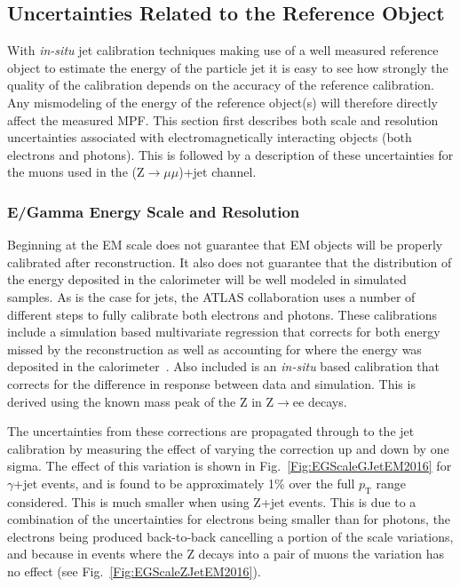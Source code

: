 \subsection{Uncertainties Related to the Reference Object}
With \textit{in-situ} jet calibration techniques making use of a well measured reference object to estimate the energy of the particle jet it is easy to see how strongly the quality of the calibration depends on the accuracy of the reference calibration.  
Any mismodeling of the energy of the reference object(s) will therefore directly affect the measured MPF.  
This section first describes both scale and resolution uncertainties associated with electromagnetically interacting objects (both electrons and photons).  
This is followed by a description of these uncertainties for the muons used in the (Z$\rightarrow\mu\mu$)+jet channel.  
\subsubsection{E/Gamma Energy Scale and Resolution}

Beginning at the EM scale does not guarantee that EM objects will be properly calibrated after reconstruction.  
It also does not guarantee that the distribution of the energy deposited in the calorimeter will be well modeled in simulated samples.  
As is the case for jets, the ATLAS collaboration uses a number of different steps to fully calibrate both electrons and photons.  
These calibrations include a simulation based multivariate regression that corrects for both energy missed by the reconstruction as well as accounting for where the energy was deposited in the calorimeter~\cite{ATL-PHYS-PUB-2016-015}.  
Also included is an \textit{in-situ} based calibration that corrects for the difference in response between data and simulation.  
This is derived using the known mass peak of the Z in Z$\rightarrow$ee decays.  

The uncertainties from these corrections are propagated through to the jet calibration by measuring the effect of varying the correction up and down by one sigma.  
The effect of this variation is shown in Fig.~\ref{Fig:EGScaleGJetEM2016} for $\gamma$+jet events, and is found to be approximately 1\% over the full $p_{\mathrm T}$ range considered.  
This is much smaller when using Z+jet events.  
This is due to a combination of the uncertainties for electrons being smaller than for photons, the electrons being produced back-to-back cancelling a portion of the scale variations, and because in events where the Z decays into a pair of muons the variation has no effect (see Fig.~\ref{Fig:EGScaleZJetEM2016}).

